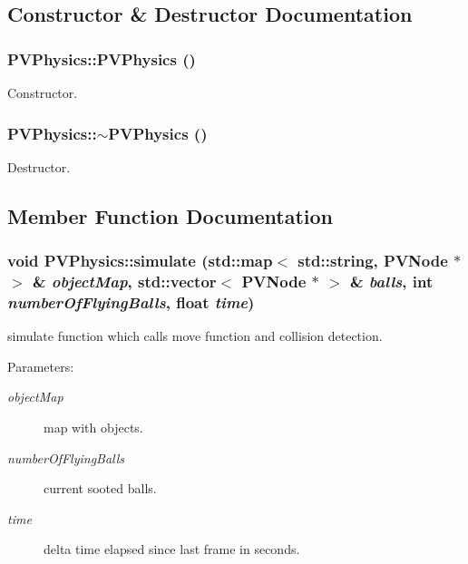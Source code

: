\subsection{Constructor \& Destructor Documentation}
\subsubsection[{PVPhysics}]{\setlength{\rightskip}{0pt plus 5cm}PVPhysics::PVPhysics ()}\label{class_p_v_physics_aed6e907849a824d51cc2ddd1ab946d7}


Constructor. 

\subsubsection[{$\sim$PVPhysics}]{\setlength{\rightskip}{0pt plus 5cm}PVPhysics::$\sim$PVPhysics ()}\label{class_p_v_physics_d1b6443d26383106cb3322671974d48e}


Destructor. 



\subsection{Member Function Documentation}
\subsubsection[{simulate}]{\setlength{\rightskip}{0pt plus 5cm}void PVPhysics::simulate (std::map$<$ std::string, {\bf PVNode} $\ast$ $>$ \& {\em objectMap}, \/  std::vector$<$ {\bf PVNode} $\ast$ $>$ \& {\em balls}, \/  int {\em numberOfFlyingBalls}, \/  float {\em time})}\label{class_p_v_physics_d12e7af8e342acdf42f83d5f1e88dc14}


simulate function which calls move function and collision detection. 

\begin{Desc}
\item[Parameters:]
\begin{description}
\item[{\em objectMap}]map with objects. \item[{\em numberOfFlyingBalls}]current sooted balls. \item[{\em time}]delta time elapsed since last frame in seconds. \end{description}
\end{Desc}
